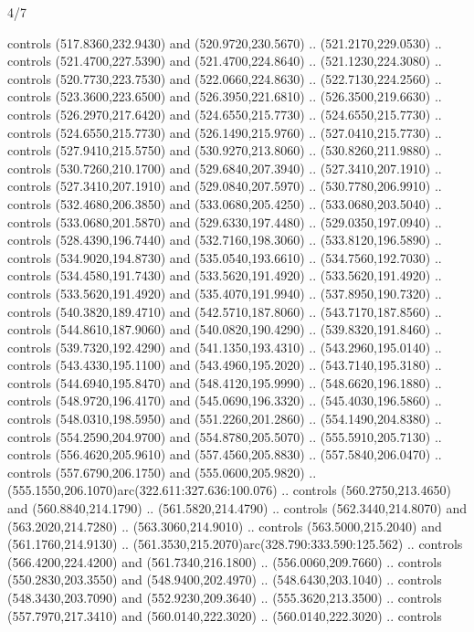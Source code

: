 \begin{flagdescription}{4/7}
\begin{scope}[shift={(0.5\flaglength,0.5\flagwidth)},scale=\flagwidth*\stretchfactor/820]
\begin{scope}[scale=1.87,xshift=-138mm,yshift=75mm]
\begin{scope}[y=0.8pt, x=0.8pt, yscale=-1, xscale=1]
\begin{scope}[fill=cd2a567]
  controls (517.8360,232.9430) and (520.9720,230.5670) .. (521.2170,229.0530) ..
  controls (521.4700,227.5390) and (521.4700,224.8640) .. (521.1230,224.3080) ..
  controls (520.7730,223.7530) and (522.0660,224.8630) .. (522.7130,224.2560) ..
  controls (523.3600,223.6500) and (526.3950,221.6810) .. (526.3500,219.6630) ..
  controls (526.2970,217.6420) and (524.6550,215.7730) .. (524.6550,215.7730) ..
  controls (524.6550,215.7730) and (526.1490,215.9760) .. (527.0410,215.7730) ..
  controls (527.9410,215.5750) and (530.9270,213.8060) .. (530.8260,211.9880) ..
  controls (530.7260,210.1700) and (529.6840,207.3940) .. (527.3410,207.1910) ..
  controls (527.3410,207.1910) and (529.0840,207.5970) .. (530.7780,206.9910) ..
  controls (532.4680,206.3850) and (533.0680,205.4250) .. (533.0680,203.5040) ..
  controls (533.0680,201.5870) and (529.6330,197.4480) .. (529.0350,197.0940) ..
  controls (528.4390,196.7440) and (532.7160,198.3060) .. (533.8120,196.5890) ..
  controls (534.9020,194.8730) and (535.0540,193.6610) .. (534.7560,192.7030) ..
  controls (534.4580,191.7430) and (533.5620,191.4920) .. (533.5620,191.4920) ..
  controls (533.5620,191.4920) and (535.4070,191.9940) .. (537.8950,190.7320) ..
  controls (540.3820,189.4710) and (542.5710,187.8060) .. (543.7170,187.8560) ..
  controls (544.8610,187.9060) and (540.0820,190.4290) .. (539.8320,191.8460) ..
  controls (539.7320,192.4290) and (541.1350,193.4310) .. (543.2960,195.0140) ..
  controls (543.4330,195.1100) and (543.4960,195.2020) .. (543.7140,195.3180) ..
  controls (544.6940,195.8470) and (548.4120,195.9990) .. (548.6620,196.1880) ..
  controls (548.9720,196.4170) and (545.0690,196.3320) .. (545.4030,196.5860) ..
  controls (548.0310,198.5950) and (551.2260,201.2860) .. (554.1490,204.8380) ..
  controls (554.2590,204.9700) and (554.8780,205.5070) .. (555.5910,205.7130) ..
  controls (556.4620,205.9610) and (557.4560,205.8830) .. (557.5840,206.0470) ..
  controls (557.6790,206.1750) and (555.0600,205.9820) ..
  (555.1550,206.1070)arc(322.611:327.636:100.076) .. controls
  (560.2750,213.4650) and (560.8840,214.1790) .. (561.5820,214.4790) .. controls
  (562.3440,214.8070) and (563.2020,214.7280) .. (563.3060,214.9010) .. controls
  (563.5000,215.2040) and (561.1760,214.9130) ..
  (561.3530,215.2070)arc(328.790:333.590:125.562) .. controls
  (566.4200,224.4200) and (561.7340,216.1800) .. (556.0060,209.7660) .. controls
  (550.2830,203.3550) and (548.9400,202.4970) .. (548.6430,203.1040) .. controls
  (548.3430,203.7090) and (552.9230,209.3640) .. (555.3620,213.3500) .. controls
  (557.7970,217.3410) and (560.0140,222.3020) .. (560.0140,222.3020) .. controls

\end{scope}
\end{scope}
\end{scope}
\end{scope}
\end{flagdescription}
